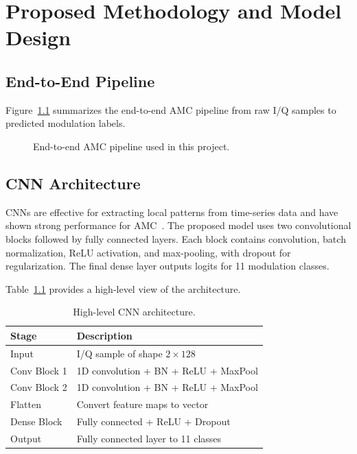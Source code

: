 \documentclass[12pt,a4paper]{report}
\begin{document}
\chapter{Proposed Methodology and Model Design}
\section{End-to-End Pipeline}
Figure~\ref{fig:amc-pipeline} summarizes the end-to-end AMC pipeline from raw I/Q samples to predicted modulation labels.

\begin{figure}[H]
    \centering
    \caption{End-to-end AMC pipeline used in this project.}
    \label{fig:amc-pipeline}
\end{figure}

\section{CNN Architecture}
CNNs are effective for extracting local patterns from time-series data and have shown strong performance for AMC~\cite{lecun1998,oshea2016cnn}. The proposed model uses two convolutional blocks followed by fully connected layers. Each block contains convolution, batch normalization, ReLU activation, and max-pooling, with dropout for regularization. The final dense layer outputs logits for 11 modulation classes.

Table~\ref{tab:cnn-arch} provides a high-level view of the architecture.

\begin{table}[H]
    \centering
    \caption{High-level CNN architecture.}
    \label{tab:cnn-arch}
    \begin{tabular}{p{} p{}}
        \toprule
        \textbf{Stage} & \textbf{Description} \\
        \midrule
        Input & I/Q sample of shape $2 \times 128$ \\
        Conv Block 1 & 1D convolution + BN + ReLU + MaxPool \\
        Conv Block 2 & 1D convolution + BN + ReLU + MaxPool \\
        Flatten & Convert feature maps to vector \\
        Dense Block & Fully connected + ReLU + Dropout \\
        Output & Fully connected layer to 11 classes \\
        \bottomrule
    \end{tabular}
\end{table}
\end{document}
